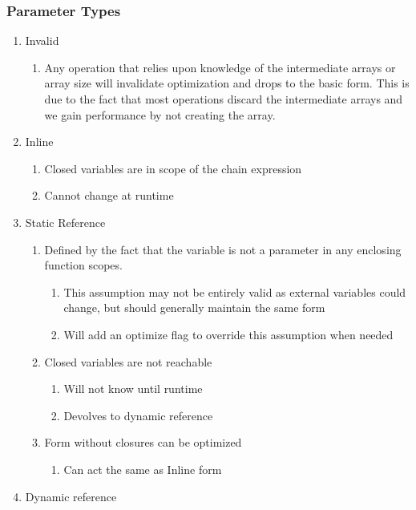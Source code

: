 \subsubsection{Parameter Types}
\begin{enumerate}
  \item Invalid
    \begin{enumerate}
      \item Any operation that relies upon knowledge of the intermediate arrays or array size will invalidate optimization and drops to the basic form.  This is due to the fact that most operations discard the intermediate arrays and we gain performance by not creating the array.
    \end{enumerate}
  \item Inline
    \begin{enumerate}
      \item Closed variables are in scope of the chain expression
      \item Cannot change at runtime
    \end{enumerate}
  \item Static Reference
    \begin{enumerate}
      \item Defined by the fact that the variable is not a parameter in any enclosing function scopes.
        \begin{enumerate}
          \item This assumption may not be entirely valid as external variables could change, but should generally maintain the same form
          \item  Will add an optimize flag to override this assumption when needed
        \end{enumerate}
      \item Closed variables are not reachable
        \begin{enumerate}
          \item Will not know until runtime
          \item Devolves to dynamic reference
        \end{enumerate}
      \item Form without closures can be optimized
        \begin{enumerate}
          \item Can act the same as Inline form
        \end{enumerate}
    \end{enumerate}
  \item Dynamic reference

\end{enumerate}
